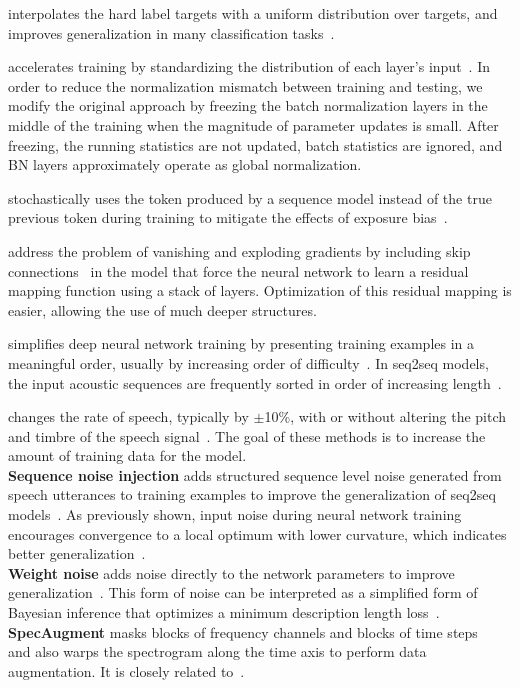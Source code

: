 \documentclass[a4paper]{article}
\begin{document}
 interpolates the hard label targets with a uniform distribution over targets, and improves generalization in many classification tasks~\cite{Szegedy2016}.

 accelerates training by standardizing the distribution of each layer's input~\cite{Ioffe2015}.
In order to reduce the normalization mismatch between training and testing, we modify the original approach by freezing the batch normalization layers in the middle of the training when the magnitude of parameter updates is small.
After freezing, the running statistics are not updated, batch statistics are ignored, and BN layers approximately operate as global normalization.

 stochastically uses the token produced by a sequence model instead of the true previous token during training to mitigate the effects of exposure bias~\cite{Bengio2015}.

 address the problem of vanishing and exploding gradients by including skip connections~\cite{He2016} in the model that force the neural network to learn a residual mapping function using a stack of layers.
Optimization of this residual mapping is easier, allowing the use of much deeper structures.

 simplifies deep neural network training by presenting training examples in a meaningful order, usually by increasing order of difficulty~\cite{Bengio2009}.
In seq2seq models, the input acoustic sequences are frequently sorted in order of increasing length~\cite{Amodei2016}.

 changes the rate of speech, typically by $\pm$10\%, with or without altering the pitch and timbre of the speech signal~\cite{Kanda2013,Ko15}.
The goal of these methods is to increase the amount of training data for the model.
\\{\bf Sequence noise injection} adds structured sequence level noise generated from speech utterances to training examples to improve the generalization of seq2seq models~\cite{Saon2019}.
As previously shown, input noise during neural network training encourages convergence to a local optimum with lower curvature, which indicates better generalization~\cite{bishop95}.
\\{\bf Weight noise} adds noise directly to the network parameters to improve generalization~\cite{Murray1994}.
This form of noise can be interpreted as a simplified form of Bayesian inference that optimizes a minimum description length loss~\cite{Graves2011}.
\\{\bf SpecAugment} masks blocks of frequency channels and blocks of time steps~\cite{Park2019} and also warps the spectrogram along the time axis to perform data augmentation.
 It is closely related to~\cite{Zhong2017}.
\end{document}
